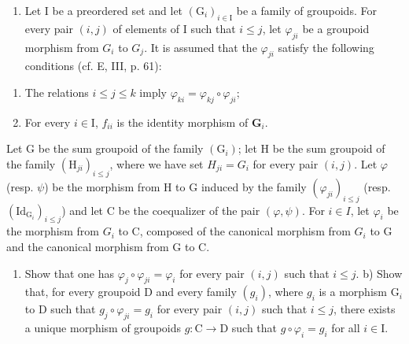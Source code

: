 \begin{enumerate}
\def\labelenumi{\arabic{enumi})}
\setcounter{enumi}{2}
\tightlist
\item
  Let I be a preordered set and let \((\mathrm{G}_{i})_{i\in\mathrm{I}}\) be a family of groupoids. For every pair \((i,j)\) of elements of I such that \(i\leqslant j\), let \(\varphi_{ji}\) be a groupoid morphism from \(G_{i}\) to \(G_{j}\). It is assumed that the \(\varphi_{ji}\) satisfy the following conditions (cf. E, III, p. 61):
\end{enumerate}

\begin{enumerate}
\def\labelenumi{(\roman{enumi})}
\item
  The relations \(i \leqslant j \leqslant k\) imply \(\varphi_{ki} = \varphi_{kj} \circ \varphi_{ji}\);
\item
  For every \(i \in \mathrm{I}\), \(f_{ii}\) is the identity morphism of \(\mathbf{G}_i\).
\end{enumerate}

Let G be the sum groupoid of the family \((\mathrm{G}_{i})\); let H be the sum groupoid of the family \((\mathrm{H}_{ji})_{i\leqslant j}\), where we have set \(H_{ji} = G_{i}\) for every pair \((i,j)\). Let \(\varphi\) (resp. \(\psi\)) be the morphism from H to G induced by the family \((\varphi_{ji})_{i\leqslant j}\) (resp. \((\mathrm{Id}_{\mathrm{G}_{i}})_{i\leqslant j}\)) and let C be the coequalizer of the pair \((\varphi,\psi)\). For \(i \in I\), let \(\varphi_{i}\) be the morphism from \(G_{i}\) to C, composed of the canonical morphism from \(G_{i}\) to G and the canonical morphism from G to C.

\begin{enumerate}
\def\labelenumi{\alph{enumi})}
\tightlist
\item
  Show that one has \(\varphi_j \circ \varphi_{ji} = \varphi_i\) for every pair \((i,j)\) such that \(i \leqslant j\). b) Show that, for every groupoid D and every family \((g_i)\), where \(g_i\) is a morphism \(\mathrm{G}_i\) to D such that \(g_j \circ \varphi_{ji} = g_i\) for every pair \((i,j)\) such that \(i \leqslant j\), there exists a unique morphism of groupoids \(g: \mathrm{C} \to \mathrm{D}\) such that \(g \circ \varphi_i = g_i\) for all \(i \in \mathrm{I}\).
\end{enumerate}


